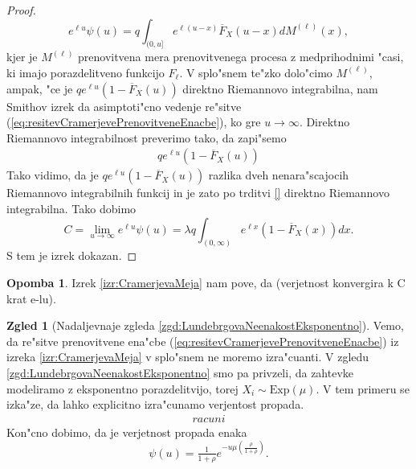 \documentclass[12pt, a4paper, reqno]{amsart}
\theoremstyle{definition}
\newtheorem{zgled}[definicija]{Zgled}
\newtheorem{opomba}[definicija]{Opomba}
\theoremstyle{plain}
\newcommand{\1}{\mathds{1}}
\begin{document}
\begin{proof}
                \begin{equation}
                    e^{\ell u}\psi(u) = q\int_{(0, u]}e^{\ell(u - x)}\overline{F}_X(u - x)dM^{(\ell)}(x),
                    \label{eq:resitevCramerjevePrenovitveneEnacbe}
                \end{equation}
                kjer je $M^{(\ell)}$ prenovitvena mera prenovitvenega procesa z medprihodnimi "casi, 
                ki imajo porazdelitveno funkcijo $F_\ell$. V splo"snem te"zko dolo"cimo $M^{(\ell)}$, 
                ampak, "ce je $qe^{\ell u}(1 - \overline{F}_X(u))$ direktno Riemannovo integrabilna, nam 
                Smithov izrek da asimptoti"cno vedenje re"sitve (\ref{eq:resitevCramerjevePrenovitveneEnacbe}),
                ko gre $u\to\infty$.
                Direktno Riemannovo integrabilnost preverimo tako, da zapi"semo 
                \begin{align*}
                    qe^{\ell u}(1 - \overline{F}_X(u))
                \end{align*}
                Tako vidimo, da je $qe^{\ell u}(1 - \overline{F}_X(u))$ razlika dveh nenara"scajocih
                Riemannovo integrabilnih funkcij in je zato po trditvi \ref{} direktno Riemannovo
                integrabilna. Tako dobimo 
                \begin{equation}
                    C = \lim_{u\to\infty}e^{\ell u}\psi(u) = \lambda q \int_{(0, \infty)}e^{\ell x}(1 - \overline{F}_X(x))dx.
                \end{equation}
                S tem je izrek dokazan.
            \end{proof}

            \begin{opomba}
                Izrek \ref{izr:CramerjevaMeja} nam pove, da (verjetnost konvergira k C krat e-lu).
                
                \label{op:pomenCramerevegaIzreka}
            \end{opomba}

            \begin{zgled}[Nadaljevnaje zgleda \ref{zgd:LundebrgovaNeenakostEksponentno}]
                Vemo, da re"sitve prenovitvene ena"cbe (\ref{eq:resitevCramerjevePrenovitveneEnacbe}) 
                iz izreka \ref{izr:CramerjevaMeja} v splo"snem ne moremo izra"cuanti.
                V zgledu \ref{zgd:LundebrgovaNeenakostEksponentno} smo pa privzeli, da zahtevke modeliramo 
                z eksponentno porazdelitvijo, torej $X_i\sim\text{Exp}(\mu)$. 
                V tem primeru se izka"ze, da lahko explicitno izra"cunamo verjentost propada.
                \begin{align*}
                    racuni
                \end{align*}
                Kon"cno dobimo, da je verjetnost propada enaka
                \begin{equation}
                    \psi(u) =  \tfrac{1}{1+\rho}e^{-u\mu\left(\frac{\rho}{1 + \rho}\right)}.
                \label{eq:eksplicitnaVerjetnostPropadaExp}
                \end{equation}
            \end{zgled}
\end{document}
